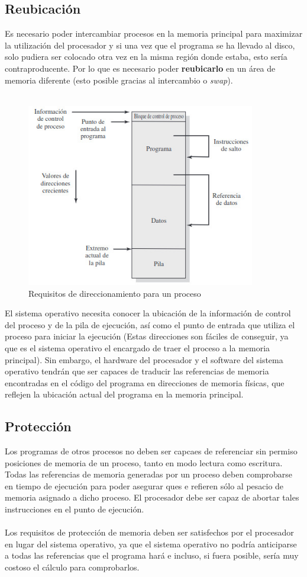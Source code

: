 \documentclass[12pt, a4paper]{article}
\begin{document}
\subsection{Reubicación}
Es necesario poder intercambiar procesos en la memoria principal para maximizar la utilización del procesador y si una vez que el programa se ha llevado al disco, solo pudiera ser colocado otra vez en la misma región donde estaba, esto sería contraproducente. Por lo que es necesario poder \textbf{reubicarlo} en un área de memoria diferente (esto posible gracias al intercambio o \textit{swap}).\\\\ 
\begin{figure}[H]
    \centering
    \includegraphics[width=10cm]{proceso1.jpeg}\par
    \caption{Requisitos de direccionamiento para un proceso}
\end{figure}
El sistema operativo necesita conocer la ubicación de la información de control del proceso y de la pila de ejecución, así como el punto de entrada que utiliza el proceso para iniciar la ejecución (Estas direcciones son fáciles de conseguir, ya que es el sistema operativo el encargado de traer el proceso a la memoria principal). Sin embargo, el hardware del procesador y el software del sistema operativo tendrán que ser capaces de traducir las referencias de memoria encontradas en el código del programa en direcciones de memoria físicas, que reflejen la ubicación actual del programa en la memoria principal.
\subsection{Protección}
Los programas de otros procesos no deben ser capcaes de referenciar sin permiso posiciones de memoria de un proceso, tanto en modo lectura como escritura. Todas las referencias de memoria generadas por un proceso deben comprobarse en tiempo de ejecución para poder asegurar ques e refieren sólo al pesacio de memoria asignado a dicho proceso. El procesador debe ser capaz de abortar tales instrucciones en el punto de ejecución.\\\\
Los requisitos de protección de memoria deben ser satisfechos por el procesador en lugar del sistema operativo, ya que el sistema operativo no podría anticiparse a todas las referencias que el programa hará e incluso, si fuera posible, sería muy costoso el cálculo para comprobarlos.
\end{document}
